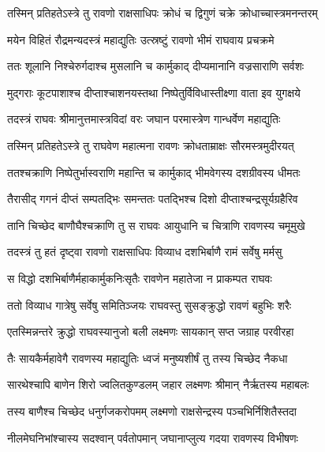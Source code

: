 
\twolineshloka
{तस्मिन् प्रतिहतेऽस्त्रे तु रावणो राक्षसाधिपः}
{क्रोधं च द्विगुणं चक्रे क्रोधाच्चास्त्रमनन्तरम्} %

\twolineshloka
{मयेन विहितं रौद्रमन्यदस्त्रं महाद्युतिः}
{उत्स्रष्टुं रावणो भीमं राघवाय प्रचक्रमे} %

\twolineshloka
{ततः शूलानि निश्चेरुर्गदाश्च मुसलानि च}
{कार्मुकाद् दीप्यमानानि वज्रसाराणि सर्वशः} %

\twolineshloka
{मुद्गराः कूटपाशाश्च दीप्ताश्चाशनयस्तथा}
{निष्पेतुर्विविधास्तीक्ष्णा वाता इव युगक्षये} %

\twolineshloka
{तदस्त्रं राघवः श्रीमानुत्तमास्त्रविदां वरः}
{जघान परमास्त्रेण गान्धर्वेण महाद्युतिः} %

\twolineshloka
{तस्मिन् प्रतिहतेऽस्त्रे तु राघवेण महात्मना}
{रावणः क्रोधताम्राक्षः सौरमस्त्रमुदीरयत्} %

\twolineshloka
{ततश्चक्राणि निष्पेतुर्भास्वराणि महान्ति च}
{कार्मुकाद् भीमवेगस्य दशग्रीवस्य धीमतः} %

\twolineshloka
{तैरासीद् गगनं दीप्तं सम्पतद्भिः समन्ततः}
{पतद्भिश्च दिशो दीप्ताश्चन्द्रसूर्यग्रहैरिव} %

\twolineshloka
{तानि चिच्छेद बाणौघैश्चक्राणि तु स राघवः}
{आयुधानि च चित्राणि रावणस्य चमूमुखे} %

\twolineshloka
{तदस्त्रं तु हतं दृष्ट्वा रावणो राक्षसाधिपः}
{विव्याध दशभिर्बाणै रामं सर्वेषु मर्मसु} %

\twolineshloka
{स विद्धो दशभिर्बाणैर्महाकार्मुकनिःसृतैः}
{रावणेन महातेजा न प्राकम्पत राघवः} %

\twolineshloka
{ततो विव्याध गात्रेषु सर्वेषु समितिञ्जयः}
{राघवस्तु सुसङ्क्रुद्धो रावणं बहुभिः शरैः} %

\twolineshloka
{एतस्मिन्नन्तरे क्रुद्धो राघवस्यानुजो बली}
{लक्ष्मणः सायकान् सप्त जग्राह परवीरहा} %

\twolineshloka
{तैः सायकैर्महावेगै रावणस्य महाद्युतिः}
{ध्वजं मनुष्यशीर्षं तु तस्य चिच्छेद नैकधा} %

\twolineshloka
{सारथेश्चापि बाणेन शिरो ज्वलितकुण्डलम्}
{जहार लक्ष्मणः श्रीमान् नैर्ऋतस्य महाबलः} %

\twolineshloka
{तस्य बाणैश्च चिच्छेद धनुर्गजकरोपमम्}
{लक्ष्मणो राक्षसेन्द्रस्य पञ्चभिर्निशितैस्तदा} %

\twolineshloka
{नीलमेघनिभांश्चास्य सदश्वान् पर्वतोपमान्}
{जघानाप्लुत्य गदया रावणस्य विभीषणः} %

